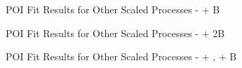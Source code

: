 \begin{frame}{POI Fit Results for Other Scaled Processes - \ttbar + B}
\vskip -0.3cm
\begin{scriptsize}

\end{scriptsize}
\vskip -0.1cm

\end{frame}

\begin{frame}{POI Fit Results for Other Scaled Processes - \ttbar + 2B}
\vskip -0.3cm
\begin{scriptsize}

\end{scriptsize}
\vskip -0.1cm

\end{frame}

\begin{frame}{POI Fit Results for Other Scaled Processes - \ttbar + \bbbar, \ttbar + B}
\vskip -0.3cm
\begin{scriptsize}

\end{scriptsize}
\vskip -0.1cm

\end{frame}

